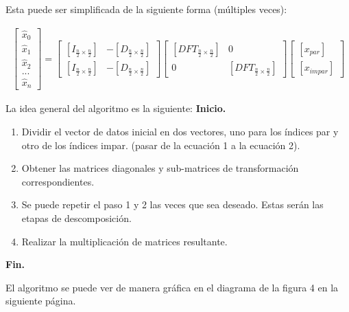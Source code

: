 \documentclass{report}
\begin{document}
\noindent
Esta puede ser simplificada de la siguiente forma (múltiples veces):

\begin{gather}
    \begin{bmatrix}
        \hat{x}_0 \\ \hat{x}_1 \\ \hat{x}_2 \\ ... \\\hat{x}_n
    \end{bmatrix}
    =
    \begin{bmatrix}
        [I_{\frac{n}{2}\times\frac{n}{2}}] & -[D_{\frac{n}{2}\times\frac{n}{2}}]\\
        [I_{\frac{n}{2}\times\frac{n}{2}}] & -[D_{\frac{n}{2}\times\frac{n}{2}}]
    \end{bmatrix}
    \begin{bmatrix}
        [DFT_{\frac{n}{2}\times\frac{n}{2}}] & 0\\
        0 & [DFT_{\frac{n}{2}\times\frac{n}{2}}]
    \end{bmatrix}
    \begin{bmatrix}
        [x_{par}] \\ [x_{impar}]
    \end{bmatrix}
\end{gather}

\vspace{0.7cm}

\noindent
\large 
La idea general del algoritmo es la siguiente:\medskip
\noindent
\textbf{Inicio.}
\begin{enumerate}
    \item Dividir el vector de datos inicial en dos vectores, uno para los índices par y otro de los índices impar. (pasar de la ecuación 1 a la ecuación 2).
    \item Obtener las matrices diagonales y sub-matrices de transformación correspondientes.
    \item Se puede repetir el paso 1 y 2 las veces que sea deseado. Estas serán las etapas de descomposición.
    \item Realizar la multiplicación de matrices resultante.
    
\end{enumerate}
\textbf{Fin.}

\vspace{0.2cm}

\normalsize
\noindent El algoritmo se puede ver de manera gráfica en el diagrama de la figura 4 en la siguiente página.\medskip
\end{document}
